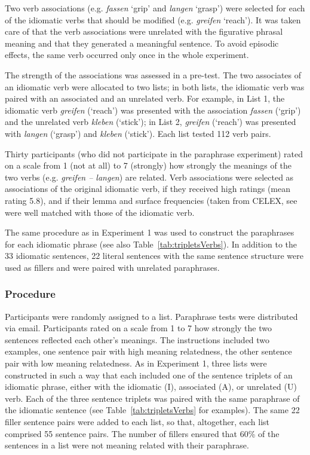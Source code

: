\documentclass[output=paper]{langsci/langscibook}
\begin{document}
Two verb associations (e.g. \textit{fassen} ‘grip’ and \textit{langen} ‘grasp’) were selected for each of the idiomatic verbs that should be modified (e.g. \textit{greifen} ‘reach’). It was taken care of that the verb associations were unrelated with the figurative phrasal meaning and that they generated a meaningful sentence. To avoid episodic effects, the same verb occurred only once in the whole experiment. 

The strength of the associations was assessed in a pre-test. The two associates of an idiomatic verb were allocated to two lists; in both lists, the idiomatic verb was paired with an associated and an unrelated verb.  For example, in List 1, the idiomatic verb \textit{greifen} (‘reach’) was presented with the association \textit{fassen} (‘grip’) and the unrelated verb \textit{kleben} (‘stick’); in List 2, \textit{greifen} (‘reach’) was presented with \textit{langen} (‘grasp’) and \textit{kleben} (‘stick’). Each list tested 112 verb pairs. 

Thirty participants (who did not participate in the paraphrase experiment) rated on a scale from 1 (not at all) to 7 (strongly) how strongly the meanings of the two verbs (e.g. \textit{greifen – langen}) are related. Verb associations were selected as associations of the original idiomatic verb, if they received high ratings (mean rating 5.8), and if their lemma and surface frequencies (taken from CELEX, see \citep{baayen:1993} were well matched with those of the idiomatic verb. 

 The same procedure as in Experiment 1 was used to construct the paraphrases for each idiomatic phrase (see also Table~\ref{tab:tripletsVerbs}). In addition to the 33 idiomatic sentences, 22 literal sentences with the same sentence structure were used as fillers and were paired with unrelated paraphrases. 

\subsubsection{Procedure}

Participants were randomly assigned to a list. Paraphrase tests were distributed via email. Participants rated on a scale from 1 to 7 how strongly the two sentences reflected each other’s meanings. The instructions included two examples, one sentence pair with high meaning relatedness, the other sentence pair with low meaning relatedness. 
As in Experiment 1, three lists were constructed in such a way that each included one of the sentence triplets of an idiomatic phrase, either with the idiomatic (I), associated (A), or unrelated (U) verb. Each of the three sentence triplets was paired with the same paraphrase of the idiomatic sentence (see Table~\ref{tab:tripletsVerbs} for examples). The same 22 filler sentence pairs were added to each list, so that, altogether, each list comprised 55 sentence pairs. The number of fillers ensured that 60\% of the sentences in a list were not meaning related with their paraphrase. 
\end{document}
